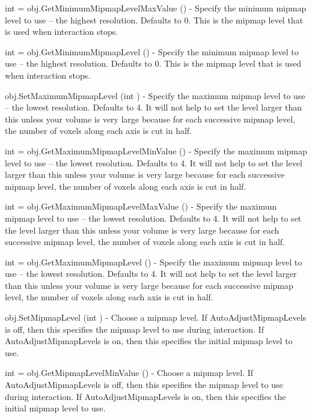 \begin{DoxyItemize}
\item {\ttfamily int = obj.\-Get\-Minimum\-Mipmap\-Level\-Max\-Value ()} -\/ Specify the minimum mipmap level to use -- the highest resolution. Defaults to 0. This is the mipmap level that is used when interaction stops.  
\item {\ttfamily int = obj.\-Get\-Minimum\-Mipmap\-Level ()} -\/ Specify the minimum mipmap level to use -- the highest resolution. Defaults to 0. This is the mipmap level that is used when interaction stops.  
\item {\ttfamily obj.\-Set\-Maximum\-Mipmap\-Level (int )} -\/ Specify the maximum mipmap level to use -- the lowest resolution. Defaults to 4. It will not help to set the level larger than this unless your volume is very large because for each successive mipmap level, the number of voxels along each axis is cut in half.  
\item {\ttfamily int = obj.\-Get\-Maximum\-Mipmap\-Level\-Min\-Value ()} -\/ Specify the maximum mipmap level to use -- the lowest resolution. Defaults to 4. It will not help to set the level larger than this unless your volume is very large because for each successive mipmap level, the number of voxels along each axis is cut in half.  
\item {\ttfamily int = obj.\-Get\-Maximum\-Mipmap\-Level\-Max\-Value ()} -\/ Specify the maximum mipmap level to use -- the lowest resolution. Defaults to 4. It will not help to set the level larger than this unless your volume is very large because for each successive mipmap level, the number of voxels along each axis is cut in half.  
\item {\ttfamily int = obj.\-Get\-Maximum\-Mipmap\-Level ()} -\/ Specify the maximum mipmap level to use -- the lowest resolution. Defaults to 4. It will not help to set the level larger than this unless your volume is very large because for each successive mipmap level, the number of voxels along each axis is cut in half.  
\item {\ttfamily obj.\-Set\-Mipmap\-Level (int )} -\/ Choose a mipmap level. If Auto\-Adjust\-Mipmap\-Levels is off, then this specifies the mipmap level to use during interaction. If Auto\-Adjust\-Mipmap\-Levels is on, then this specifies the initial mipmap level to use.  
\item {\ttfamily int = obj.\-Get\-Mipmap\-Level\-Min\-Value ()} -\/ Choose a mipmap level. If Auto\-Adjust\-Mipmap\-Levels is off, then this specifies the mipmap level to use during interaction. If Auto\-Adjust\-Mipmap\-Levels is on, then this specifies the initial mipmap level to use.  

\end{DoxyItemize}
